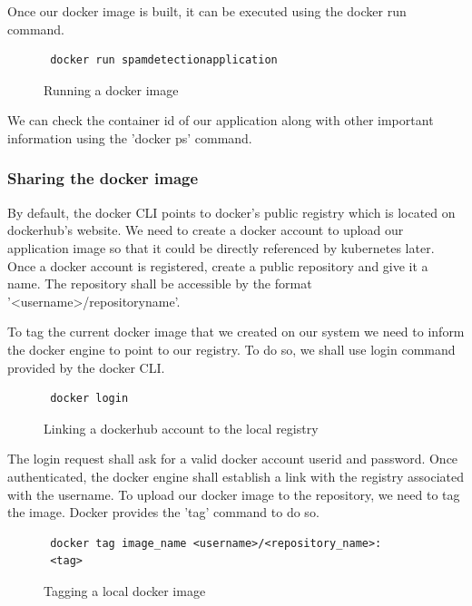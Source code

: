 \documentclass[9pt,twocolumn,twoside]{../../styles/osajnl}
\begin{document}
\noindent
Once our docker image is built, it can be executed using the docker
run command.

\begin{figure}[H]
\begin{verbatim}
 docker run spamdetectionapplication
\end{verbatim}
\caption{Running a docker image}
\label{Running a docker image}
\end{figure}

\noindent
We can check the container id of our application along with other
important information using the 'docker ps' command.
 
\subsubsection{Sharing the docker image}

By default, the docker CLI points to docker's public registry which is
located on dockerhub's website. We need to create a docker
account to upload our application image so that it could be directly
referenced by kubernetes later. Once a docker account is registered,
create a public repository and give it a name. The repository shall be
accessible by the format '<username>/repositoryname'.

\noindent
To tag the current docker image that we created on our system we need
to inform the docker engine to point to our registry. To do so, we
shall use login command provided by the docker CLI.

\begin{figure}[H]
\begin{verbatim}
 docker login
\end{verbatim}
\caption{Linking a dockerhub account to the local registry}
\label{Linking a dockerhub account to the local registry}
\end{figure}

\noindent
The login request shall ask for a valid docker account userid and
password. Once authenticated, the docker engine shall establish a link
with the registry associated with the username. To upload our docker
image to the repository, we need to tag the image. Docker provides the
'tag' command to do so.

\begin{figure}[H]
\begin{verbatim}
 docker tag image_name <username>/<repository_name>:
 <tag>
\end{verbatim}
\caption{Tagging a local docker image}
\label{Tagging a local docker image}
\end{figure}
\end{document}
